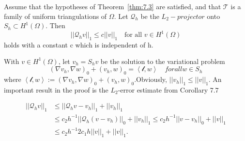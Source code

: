\begin{corollary}
    Assume that the hypotheses of Theorem~\ref{thm:7.3} are satisfied, and that $\mathcal{T}$ is a family of uniform triangulations of $\Omega$. Let $\mathcal{Q}_h$ be the $L_2-projector$ onto $S_h \subset H^1(\Omega)$. Then
    \begin{equation}
        ||\mathcal{Q}_h v||_1 \leq c||v||_1\quad \text{for all } v\in H^1(\Omega)
    \end{equation}
    holds with a constant c which is independent of h.
\end{corollary}

\begin{bev}
    With $v \in H^1(\Omega)$, let $v_h = S_h v$ be the solution to the variational problem
    \begin{equation}
        {\left( \nabla v_h, \nabla w \right)}_0 + {\left( v_h, w \right)}_0 = \left< \mathcal{l}, w \right> \quad for all w \in S_h
    \end{equation}
    where $\left< \mathcal{l}, w \right> := {\left( \nabla v_h, \nabla w \right)}_0 + {\left( v_h, w \right)}_0$.Obviously, $||v_h||_1 \leq ||v||_1$. An important result in the proof is the $L_2$-error estimate from Corollary 7.7 %


    \begin{align}
        || \mathcal{Q}_h v ||_1 &\leq || \mathcal{Q}_h v - v_h||_1 + ||v_h||_1 \\
                                &\leq c_2 h^{-1} ||\mathcal{Q}_h \left( v - v_h \right)||_0 + ||v_h||_1 \leq c_2h^{-1}||v-v_h||_0 + ||v||_1 \\
                                &\leq c_2h^{-1}2c_1h||v||_1 + ||v||_1.
    \end{align}
\end{bev}